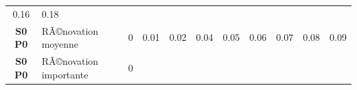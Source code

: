 \documentclass[]{article}
\begin{document}
\begin{longtable}[]{@{}clrrrrrrrrr@{}}
\begin{minipage}[t]{0.05\columnwidth}
0.16\strut
\end{minipage} & \begin{minipage}[t]{0.05\columnwidth}\raggedleft\strut
0.18\strut
\end{minipage}\tabularnewline
\begin{minipage}[t]{0.12\columnwidth}\centering\strut
\textbf{S0 P0}\strut
\end{minipage} & \begin{minipage}[t]{0.17\columnwidth}\raggedright\strut
RÃ©novation moyenne\strut
\end{minipage} & \begin{minipage}[t]{0.05\columnwidth}\raggedleft\strut
0\strut
\end{minipage} & \begin{minipage}[t]{0.05\columnwidth}\raggedleft\strut
0.01\strut
\end{minipage} & \begin{minipage}[t]{0.05\columnwidth}\raggedleft\strut
0.02\strut
\end{minipage} & \begin{minipage}[t]{0.05\columnwidth}\raggedleft\strut
0.04\strut
\end{minipage} & \begin{minipage}[t]{0.05\columnwidth}\raggedleft\strut
0.05\strut
\end{minipage} & \begin{minipage}[t]{0.05\columnwidth}\raggedleft\strut
0.06\strut
\end{minipage} & \begin{minipage}[t]{0.05\columnwidth}\raggedleft\strut
0.07\strut
\end{minipage} & \begin{minipage}[t]{0.05\columnwidth}\raggedleft\strut
0.08\strut
\end{minipage} & \begin{minipage}[t]{0.05\columnwidth}\raggedleft\strut
0.09\strut
\end{minipage}\tabularnewline
\begin{minipage}[t]{0.12\columnwidth}\centering\strut
\textbf{S0 P0}\strut
\end{minipage} & \begin{minipage}[t]{0.17\columnwidth}\raggedright\strut
RÃ©novation importante\strut
\end{minipage} & \begin{minipage}[t]{0.05\columnwidth}\raggedleft\strut
0\strut
\end{minipage} & \begin{minipage}[t]{0.05\columnwidth}\raggedleft\strut

\end{minipage}
\end{longtable}
\end{document}
